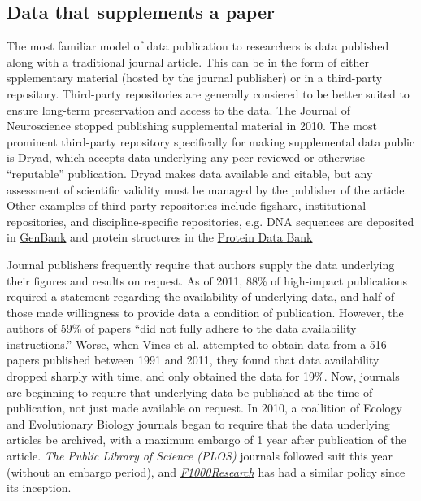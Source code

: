 \documentclass[10pt,twocolumn]{article}
\begin{document}
\subsection*{Data that supplements a paper}\label{paper-supplement-data}

The most familiar model of data publication to researchers is data published along with a traditional journal article.
This can be in the form of either spplementary material (hosted by the journal publisher) or in a third-party repository.
Third-party repositories are generally consiered to be better suited to ensure long-term preservation and access to the data.
The Journal of Neuroscience stopped publishing supplemental material in 2010.\cite{maunsell_announcement_2010}
The most prominent third-party repository specifically for making supplemental data public is \href{http://www.datadryad.org/}{Dryad}, which accepts data underlying any peer-reviewed or otherwise ``reputable'' publication.
Dryad makes data available and citable, but any assessment of scientific validity must be managed by the publisher of the article.
Other examples of third-party repositories include \href{http://figshare.com/}{figshare}, institutional repositories, and discipline-specific repositories, e.g. DNA sequences are deposited in \href{http://www.ncbi.nlm.nih.gov/genbank/}{GenBank}\cite{benson_genbank_2013} and protein structures in the \href{http://www.rcsb.org/}{Protein Data Bank}\cite{berman_protein_2000}

Journal publishers frequently require that authors supply the data underlying their figures and results on request.
As of 2011, 88\% of high-impact publications required a statement regarding the availability of underlying data, and half of those made willingness to provide data a condition of publication.\cite{alsheikh-ali_public_2011}
However, the authors of 59\% of papers ``did not fully adhere to the data availability instructions.''
Worse, when Vines et al. attempted to obtain data from a 516 papers published between 1991 and 2011, they found that data availability dropped sharply with time, and only obtained the data for 19\%.\cite{vines_availability_2014}
Now, journals are beginning to require that underlying data be published at the time of publication, not just made available on request.
In 2010, a coallition of Ecology and Evolutionary Biology journals began to require that the data underlying articles be archived, with a maximum embargo of 1 year after publication of the article.\cite{whitlock_data_2010, fairbairn_advent_2010}
{\emph{The Public Library of Science (PLOS)}} journals followed suit this year (without an embargo period)\cite{bloom_data_2014}, and \href{http://f1000research.com}{\emph{F1000Research}} has had a similar policy since its inception.
\end{document}
